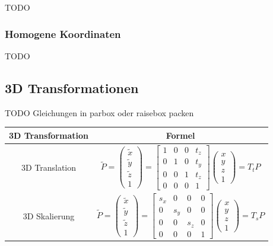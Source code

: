 \documentclass{scrartcl}
\begin{document}
TODO

\subsubsection{Homogene Koordinaten}

TODO

\subsection{3D Transformationen}

TODO Gleichungen in parbox oder raisebox packen

\begin{tabular}{|c|c|}
	\hline 3D Transformation & Formel \\ 
	\hline 3D Translation & $\widetilde{P} = \begin{pmatrix}
	\widetilde{x} \\
	\widetilde{y} \\
	\widetilde{z} \\
	1
	\end{pmatrix} = \begin{bmatrix}
	1 & 0 & 0 & t_z \\
	0 & 1 & 0 & t_y \\
	0 & 0 & 1 & t_z \\
	0 & 0 & 0 & 1
	\end{bmatrix} \begin{pmatrix}
	x \\
	y \\
	z \\
	1
	\end{pmatrix} = T_t P$ \\
	\hline 3D Skalierung & $\widetilde{P} = \begin{pmatrix}
	\widetilde{x} \\ \widetilde{y} \\ \widetilde{z} \\ 1
	\end{pmatrix} = \begin{bmatrix}
	s_x & 0 & 0 & 0 \\
	0 & s_y & 0 & 0 \\
	0 & 0 & s_z & 0 \\
	0 & 0 & 0 & 1
	\end{bmatrix} \begin{pmatrix}
	x \\
	y \\
	z \\
	1
	\end{pmatrix} = T_s P$ \\

\end{tabular}
\end{document}

